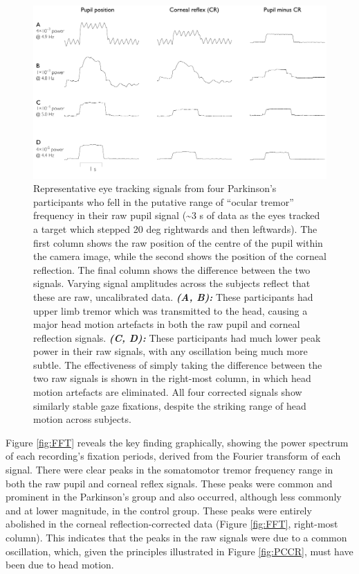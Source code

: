 \documentclass[jou,a4paper]{apa6}
\begin{document}
\begin{figure}[htbp]
\begin{center}
\includegraphics {Figures/Figure_2_Individual_traces}
\caption{Representative eye tracking signals from four Parkinson's participants who fell in the putative range of ``ocular tremor'' frequency in their raw pupil signal (\textasciitilde{}3 s of data as the eyes tracked a target which stepped 20 deg rightwards and then leftwards). The first column shows the raw position of the centre of the pupil within the camera image, while the second shows the position of the corneal reflection. The final column shows the difference between the two signals. Varying signal amplitudes across the subjects reflect that these are raw, uncalibrated data. \textbf{\textit{(A, B):}} These participants had upper limb tremor which was transmitted to the head, causing a major head motion artefacts in both the raw pupil and corneal reflection signals. \textbf{\textit{(C, D):}} These participants had much lower peak power in their raw signals, with any oscillation being much more subtle.
The effectiveness of simply taking the difference between the two raw signals is shown in the right-most column, in which head motion artefacts are eliminated. All four corrected signals show similarly stable gaze fixations, despite the striking range of head motion across subjects.
}
\label{fig:traces}
\end{center}
\end{figure}

Figure \ref{fig:FFT} reveals the key finding graphically, showing the power spectrum of each recording's fixation periods, derived from the Fourier transform of each signal. There were clear peaks in the somatomotor tremor frequency range in both the raw pupil and corneal reflex signals. These peaks were common and prominent in the Parkinson's group and also occurred, although less commonly and at lower magnitude, in the control group. These peaks were entirely abolished in the corneal reflection-corrected data (Figure \ref{fig:FFT}, right-most column). This indicates that the peaks in the raw signals were due to a common oscillation, which, given the principles illustrated in Figure \ref{fig:PCCR}, must have been due to head motion.
\end{document}
